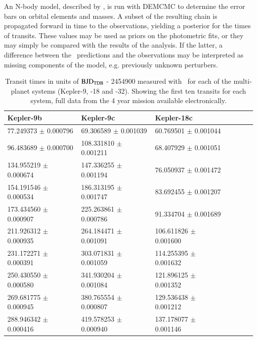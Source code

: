 An N-body model, described by \citep{Fabrycky2010}, is run with DEMCMC to determine the error bars on orbital elements and masses. A subset of the resulting chain is propagated forward in time to the \spitzer observations, yielding a posterior for the times of transits. These values may be used as priors on the photometric fits, or they may simply be compared with the results of the \spitzer analysis. If the latter, a difference between the \Kepler~predictions and the \spitzer observations may be interpreted as missing components of the model, e.g. previously unknown perturbers.

\begin{table}
\caption{Transit times in units of $\rm BJD_{TDB}$ - 2454900 measured with \Kepler~for each of the multi-planet systems (Kepler-9, -18 and -32). Showing the first ten transits for each system, full data from the 4 year mission available electronically.}
\label{P4:tab:keplerTs}
    \begin{tabular}{lllllll}
      \hline\hline
      Kepler-9b &  Kepler-9c & Kepler-18c    \\
      \hline
       77.249373 $\pm$    0.000796 &   69.306589 $\pm$    0.001039 &  60.769501 $\pm$     0.001044    \\
       96.483689 $\pm$    0.000700 &  108.331810 $\pm$    0.001211 &  68.407929 $\pm$     0.001051    \\
      134.955219 $\pm$    0.000674 &  147.336255 $\pm$    0.001194 &  76.050937 $\pm$     0.001472    \\
      154.191546 $\pm$    0.000534 &  186.313195 $\pm$    0.001747 &  83.692455 $\pm$     0.001207    \\
      173.434560 $\pm$    0.000907 &  225.263861 $\pm$    0.000786 &  91.334704 $\pm$     0.001689    \\
      211.926312 $\pm$    0.000935 &  264.184471 $\pm$    0.001091 & 106.611826 $\pm$     0.001600    \\
      231.172271 $\pm$    0.000391 &  303.071831 $\pm$    0.001059 & 114.255395 $\pm$     0.001632    \\
      250.430550 $\pm$    0.000580 &  341.930204 $\pm$    0.001084 & 121.896125 $\pm$     0.001352    \\
      269.681775 $\pm$    0.000945 &  380.765554 $\pm$    0.000807 & 129.536438 $\pm$     0.001212    \\
      288.946342 $\pm$    0.000416 &  419.578253 $\pm$    0.000940 & 137.178077 $\pm$     0.001146    \\

\end{tabular}
\end{table}
